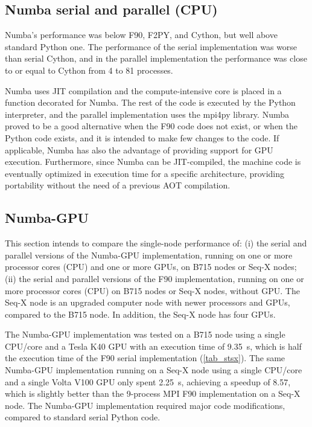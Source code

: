 %
%
%
\subsection{Numba serial and parallel (CPU)}
\label{sec_stennumb}

Numba's performance was below F90, F2PY, and Cython, but well above standard Python one. The performance of the serial implementation was worse than serial Cython, and in the parallel implementation the performance was close to or equal to Cython from 4 to 81 processes.

Numba uses JIT compilation and the compute-intensive core is placed in a function decorated for Numba. The rest of the code is executed by the Python interpreter, and the parallel implementation uses the mpi4py library. Numba proved to be a good alternative when the F90 code does not exist, or when the Python code exists, and it is intended to make few changes to the code. If applicable, Numba has also the advantage of providing support for GPU execution. Furthermore, since Numba can be JIT-compiled, the machine code is eventually optimized in execution time for a specific architecture, providing portability without the need of a previous AOT compilation. 

%
%
%
\subsection{Numba-GPU}
\label{sec_stengpu}

This section intends to compare the single-node performance of: 
(i) the serial and parallel versions of the Numba-GPU implementation, running on one or more processor cores (CPU) and one or more GPUs, on B715 nodes or Seq-X nodes; 
(ii) the serial and parallel versions of the F90 implementation, running on one or more processor cores (CPU) on B715 nodes or Seq-X nodes, without GPU. 
The Seq-X node is an upgraded computer node with newer processors and GPUs, compared to the B715 node. In addition, the Seq-X node has four GPUs.  

The Numba-GPU implementation was tested on a B715 node using a single CPU/core and a Tesla K40 GPU with an execution time of 9.35~s, which is half the execution time of the F90 serial implementation (\autoref {tab_stsx}). The same Numba-GPU implementation running on a Seq-X node using a single CPU/core and a single Volta V100 GPU only spent 2.25~s, achieving a speedup of 8.57, which is slightly better than the 9-process MPI F90 implementation on a Seq-X node. The Numba-GPU implementation required major code modifications, compared to standard serial Python code. 

